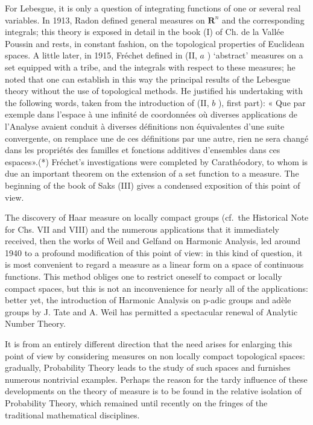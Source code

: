 For Lebesgue, it is only a question of integrating functions of one or several real variables. In 1913, Radon defined general measures on \(\mathbf{R}^n\) and the corresponding integrals; this theory is exposed in detail in the book (I) of Ch. de la Vallée Poussin and rests, in constant fashion, on the topological properties of Euclidean spaces. A little later, in 1915, Fréchet defined in (II, \(a\) ) `abstract' measures on a set equipped with a tribe, and the integrals with respect to these measures; he noted that one can establish in this way the principal results of the Lebesgue theory without the use of topological methods. He justified his undertaking with the following words, taken from the introduction of (II, \(b\) ), first part): « Que par exemple dans l'espace à une infinité de coordonnées où diverses applications de l'Analyse avaient conduit à diverses définitions non équivalentes d'une suite convergente, on remplace une de ces définitions par une autre, rien ne sera changé dans les propriétés des familles et fonctions additives d'ensembles dans ces espaces».(*) Fréchet's investigations were completed by Carathéodory, to whom is due an important theorem on the extension of a set function to a measure. The beginning of the book of Saks (III) gives a condensed exposition of this point of view.

The discovery of Haar measure on locally compact groups (cf.~the Historical Note for Chs. VII and VIII) and the numerous applications that it immediately received, then the works of Weil and Gelfand on Harmonic Analysis, led around 1940 to a profound modification of this point of view: in this kind of question, it is most convenient to regard a measure as a linear form on a space of continuous functions. This method obliges one to restrict oneself to compact or locally compact spaces, but this is not an inconvenience for nearly all of the applications: better yet, the introduction of Harmonic Analysis on p-adic groups and adèle groups by J. Tate and A. Weil has permitted a spectacular renewal of Analytic Number Theory.

It is from an entirely different direction that the need arises for enlarging this point of view by considering measures on non locally compact topological spaces: gradually, Probability Theory leads to the study of such spaces and furnishes numerous nontrivial examples. Perhaps the reason for the tardy influence of these developments on the theory of measure is to be found in the relative isolation of Probability Theory, which remained until recently on the fringes of the traditional mathematical disciplines.

